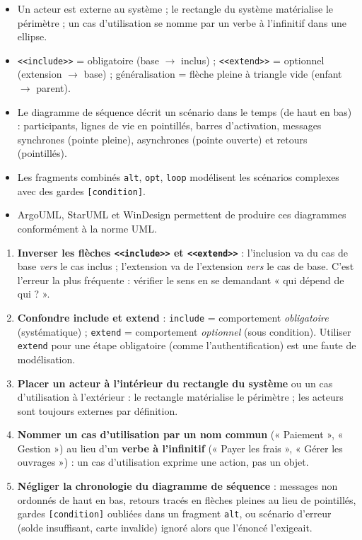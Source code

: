 \documentclass[11pt]{article}
\newcommand{\cle}[1]{{\popxbold\color{popdark}#1}}
\begin{document}
\begin{aretenir}
\begin{itemize}
\item Un \cle{acteur} est externe au système ; le \cle{rectangle du système} matérialise le périmètre ; un \cle{cas d'utilisation} se nomme par un verbe à l'infinitif dans une ellipse.
\item \texttt{<<include>>} = obligatoire (base $\rightarrow$ inclus) ; \texttt{<<extend>>} = optionnel (extension $\rightarrow$ base) ; généralisation = flèche pleine à triangle vide (enfant $\rightarrow$ parent).
\item Le \cle{diagramme de séquence} décrit un scénario dans le temps (de haut en bas) : participants, lignes de vie en pointillés, barres d'activation, messages synchrones (pointe pleine), asynchrones (pointe ouverte) et retours (pointillés).
\item Les fragments combinés \texttt{alt}, \texttt{opt}, \texttt{loop} modélisent les scénarios complexes avec des gardes \texttt{[condition]}.
\item ArgoUML, StarUML et WinDesign permettent de produire ces diagrammes conformément à la norme UML.
\end{itemize}
\end{aretenir}

\begin{attention}
\begin{enumerate}
\item \textbf{Inverser les flèches \texttt{<<include>>} et \texttt{<<extend>>}} : l'inclusion va du cas de base \emph{vers} le cas inclus ; l'extension va de l'extension \emph{vers} le cas de base. C'est l'erreur la plus fréquente : vérifier le sens en se demandant « qui dépend de qui ? ».
\item \textbf{Confondre include et extend} : \texttt{include} = comportement \emph{obligatoire} (systématique) ; \texttt{extend} = comportement \emph{optionnel} (sous condition). Utiliser \texttt{extend} pour une étape obligatoire (comme l'authentification) est une faute de modélisation.
\item \textbf{Placer un acteur à l'intérieur du rectangle du système} ou un cas d'utilisation à l'extérieur : le rectangle matérialise le périmètre ; les acteurs sont toujours externes par définition.
\item \textbf{Nommer un cas d'utilisation par un nom commun} (« Paiement », « Gestion ») au lieu d'un \textbf{verbe à l'infinitif} (« Payer les frais », « Gérer les ouvrages ») : un cas d'utilisation exprime une action, pas un objet.
\item \textbf{Négliger la chronologie du diagramme de séquence} : messages non ordonnés de haut en bas, retours tracés en flèches pleines au lieu de pointillés, gardes \texttt{[condition]} oubliées dans un fragment \texttt{alt}, ou scénario d'erreur (solde insuffisant, carte invalide) ignoré alors que l'énoncé l'exigeait.
\end{enumerate}
\end{attention}
\end{document}
